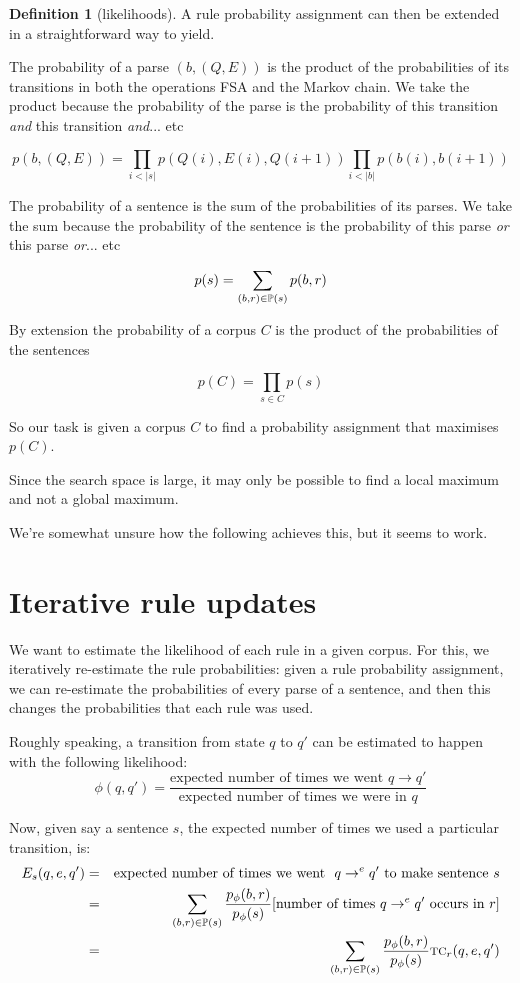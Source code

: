\documentclass[12pt]{article}
\theoremstyle{definition}
\newtheorem{definition}{Definition}[section]
\begin{document}
\begin{definition}[likelihoods]
A rule probability assignment can then be extended in a straightforward way to yield. 

The probability of a parse $(b,(Q,E))$ is the product of the probabilities of its transitions in both the operations FSA and the Markov chain. We take the product because the probability of the parse is the probability of this transition \textit{and} this transition \textit{and}... etc

$$p(b,(Q,E)) = \prod_{i<|s|} p(Q(i),E(i),Q(i+1)) \prod_{i<|b|} p(b(i),b(i+1))$$


The probability of a sentence is the sum of the probabilities of its parses. We take the sum because the probability of the sentence is the probability of this parse \textit{or} this parse \textit{or}... etc

$$p(s) = \sum_{(b,r)\in\mathbb{P}(s)} p(b,r)$$

 By extension the probability of a corpus $C$ is the product of the probabilities of the sentences

$$p(C)=\prod_{s\in C}p(s)$$
\end{definition}

So our task is given a corpus $C$ to find a probability assignment that maximises $p(C)$. 

Since the search space is large, it may only be possible to find a local maximum and not a global maximum.

We're somewhat unsure how the following achieves this, but it seems to work.


\section{Iterative rule updates}


We want to estimate the likelihood of each rule in a given corpus. For this, we iteratively re-estimate the rule probabilities: given a rule probability assignment, we can re-estimate the probabilities of every parse of a sentence, and then this changes the probabilities that each rule was used.

Roughly speaking, a transition from state $q$ to $q'$ can be estimated to happen with the following likelihood:
$$\phi(q,q') = \frac{\textrm{expected number of times we went }q\rightarrow q'}{\textrm{expected number of times we were in }q}$$

Now, given say a sentence $s$, the expected number of times we used a particular transition, is:
\begin{eqnarray*}
  E_s(q,e,q') & = & \textrm{expected number of times we went }~q\rightarrow^eq'~\textrm{to make sentence}~s \\
  & = & \sum_{(b,r)\in\mathbb{P}(s)}\frac{p_\phi(b,r)}{p_\phi(s)}[\textrm{number of times}~q\rightarrow^eq'\textrm{ occurs in }r ] \\
  & = & \sum_{(b,r)\in\mathbb{P}(s)}\frac{p_\phi(b,r)}{p_\phi(s)}\text{\textsc{tc}}_r(q,e,q')
  \end{eqnarray*}
\end{document}
